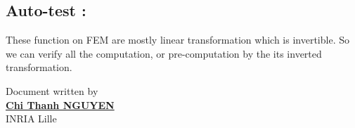 \documentclass[a4paper,10pt]{article}
\begin{document}
\subsection{Auto-test : }
These function on FEM are mostly linear transformation which is invertible. So we can verify all the computation, or pre-computation by the its inverted transformation. 


						      \begin{flushright}
						      Document written by \\
						      \href{mailto:chi-thanh.nguyen@inria.fr}{{\textbf {Chi Thanh NGUYEN}}} \\
						      INRIA Lille
						      \end{flushright}



\end{document}
